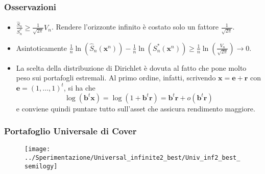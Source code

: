 \documentclass{beamer}
\theoremstyle{plain}
\theoremstyle{definition}
\theoremstyle{remark}
\newcommand{\x}{\bm{x}}
\newcommand{\B}{\bm{b}}
\newcommand{\Sh}{\hat{S}}
\begin{document}
\begin{frame}
	\frametitle{Osservazioni}
	\begin{itemize}
		\item $\frac{\Sh_n}{S_n^*}\geq \frac{1}{\sqrt{2\pi}}V_n$. Rendere l'orizzonte infinito è costato solo un fattore $\frac{1}{\sqrt{2\pi}}$.
		\item Asintoticamente $\displaystyle\frac{1}{n}\ln(\Sh_n(\x^n))-\frac{1}{n}\ln(S_n^*(\x^n))\geq\frac{1}{n}\ln\left(\frac{V_n}{\sqrt{2\pi}}\right)\rightarrow 0$.
		\item La scelta della distribuzione di Dirichlet è dovuta al fatto che pone molto peso sui portafogli estremali. Al primo ordine, infatti, scrivendo $\x = \bm{e}+\bm{r}$ con $\bm{e} = (1,\ldots,1)^t$, si ha che
		\begin{equation*}
		\log(\B^t\x)=\log(1+\B^t\bm{r})=\B^t\bm{r}+o(\B^t\bm{r})
		\end{equation*}
		e conviene quindi puntare tutto sull'asset che assicura rendimento maggiore.
	\end{itemize}
\end{frame}



\begin{frame}
	\frametitle{Portafoglio Universale di Cover}
	\begin{figure}
		\centering
		\texttt{[image: ../Sperimentazione/Universal\_infinite2\_best/Univ\_inf2\_best\_semilogy]}
		\caption{}
		\label{fig:univinf2bestsemilogy}
	\end{figure}
	
\end{frame}
\end{document}
